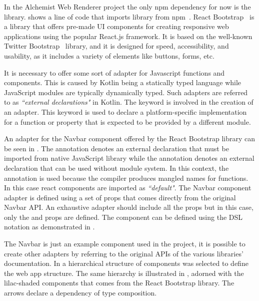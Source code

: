In the Alchemist Web Renderer project the only npm dependency for now is the  library.  shows a line of code that imports library from npm~\cite{Usedepen41:online}.
React Bootstrap~\cite{reactboo79:online} is a library that offers pre-made UI components for creating responsive web applications using the popular React.js framework. It is based on the well-known Twitter Bootstrap~\cite{Bootstra57:online} library, and it is designed for speed, accessibility, and usability, as it includes a variety of elements like buttons, forms, etc.\newline

It is necessary to offer some sort of adapter for Javascript functions and components. This is caused by Kotlin being a statically typed language while JavaScript modules are typically dynamically typed. Such adapters are referred to as \textit{``external declarations"} in Kotlin. The  keyword is involved in the creation of an adapter. This keyword is used to declare a platform-specific implementation for a function or property that is expected to be provided by a different module.\newline





An adapter for the Navbar component offered by the React Bootstrap library can be seen in . The  annotation denotes an external declaration that must be imported from native JavaScript library while the  annotation denotes an external declaration that can be used without module system. In this context, the  annotation is used because the compiler produces mangled names for functions. In this case react components are imported as \textit{``default"}. The Navbar component adapter is defined using a set of props that comes directly from the original Navbar API. An exhaustive adapter should include all the props but in this case, only the  and  props are defined. The component can be defined using the DSL notation as demonstrated in .\newline




The Navbar is just an example component used in the project, it is possible to create other adapters by referring to the original APIs of the various libraries' documentation. In  a hierarchical structure of components was selected to define the web app structure. The same hierarchy is illustrated in , adorned with the lilac-shaded components that comes from the React Bootstrap library. The arrows declare a dependency of type composition.
